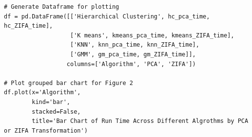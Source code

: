 \documentclass[12pt]{article}
\theoremstyle{definition}
\begin{document}
\begin{lstlisting}
# Generate Dataframe for plotting
df = pd.DataFrame([['Hierarchical Clustering', hc_pca_time, hc_ZIFA_time], 
                   ['K means', kmeans_pca_time, kmeans_ZIFA_time],
                   ['KNN', knn_pca_time, knn_ZIFA_time], 
                   ['GMM', gm_pca_time, gm_ZIFA_time]],
                  columns=['Algorithm', 'PCA', 'ZIFA'])

# Plot grouped bar chart for Figure 2
df.plot(x='Algorithm',
        kind='bar',
        stacked=False,
        title='Bar Chart of Run Time Across Different Algrothms by PCA or ZIFA Transformation')




\end{lstlisting}
\end{document}

